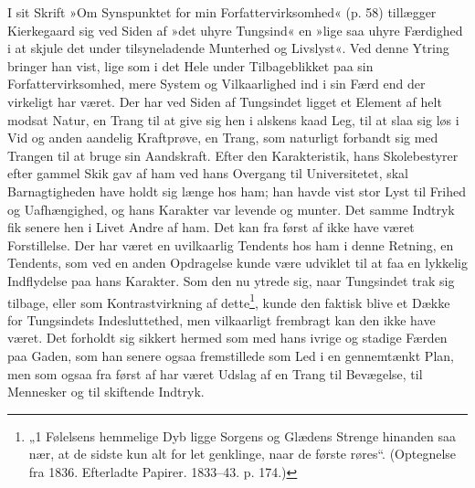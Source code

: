 \documentclass[12pt,a4paper,openany]{book}
\newcommand{\opage}[1]{\marginnote{\footnotesize\textit{[#1]}}}
\begin{document}
I sit Skrift »Om Synspunktet for min Forfattervirksomhed«
(p. 58) tillægger Kierkegaard sig ved Siden af
»det uhyre Tungsind« en »lige saa uhyre Færdighed i
at skjule det under tilsyneladende Munterhed og Livslyst«.
Ved denne Ytring bringer han vist, lige som i
det Hele under Tilbageblikket paa sin Forfattervirksomhed,
mere System og Vilkaarlighed ind i sin Færd end
der virkeligt har været. Der har ved Siden af Tungsindet
ligget et Element af helt modsat Natur, en Trang
til at give sig hen i alskens kaad Leg, til at slaa sig løs
i Vid og anden aandelig Kraftprøve, en Trang, som naturligt
forbandt sig med Trangen til at bruge sin Aandskraft.
Efter den Karakteristik, hans Skolebestyrer efter gammel
Skik gav af ham ved hans Overgang til Universitetet,
skal Barnagtigheden have holdt sig længe hos ham; han
havde vist stor Lyst til Frihed og Uafhængighed, og
hans Karakter var levende og munter. Det samme Indtryk
fik senere hen i Livet Andre af ham. Det kan fra
først af ikke have været Forstillelse. Der har været en
uvilkaarlig Tendents hos ham i denne Retning, en Tendents,
som ved en anden Opdragelse kunde være udviklet
til at faa en lykkelig Indflydelse paa hans Karakter.
Som den nu ytrede sig, naar Tungsindet trak sig tilbage,
\opage{34}eller som Kontrastvirkning af dette\footnote{„1 Følelsens hemmelige Dyb ligge Sorgens og Glædens Strenge hinanden saa nær, at de sidste kun alt for let genklinge, naar de første røres“. (Optegnelse fra 1836. Efterladte Papirer. 1833--43. p. 174.)}, kunde den faktisk
blive et Dække for Tungsindets Indesluttethed, men vilkaarligt
frembragt kan den ikke have været. Det forholdt
sig sikkert hermed som med hans ivrige og stadige
Færden paa Gaden, som han senere ogsaa fremstillede
som Led i en gennemtænkt Plan, men som ogsaa fra
først af har været Udslag af en Trang til Bevægelse, til
Mennesker og til skiftende Indtryk.
\end{document}
